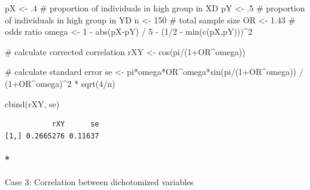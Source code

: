 \documentclass[
  letterpaper,
  DIV=11,
  numbers=noendperiod]{scrreprt}
\let\oldparagraph\paragraph
\renewcommand{\paragraph}[1]{\oldparagraph{#1}\mbox{}}
\newenvironment{Shaded}{}{}
\newcommand{\CommentTok}[1]{\textcolor[rgb]{0.54,0.53,0.53}{#1}}
\newcommand{\DecValTok}[1]{\textcolor[rgb]{0.69,0.50,0.00}{#1}}
\newcommand{\FloatTok}[1]{\textcolor[rgb]{0.69,0.50,0.00}{#1}}
\newcommand{\FunctionTok}[1]{\textcolor[rgb]{0.39,0.29,0.61}{#1}}
\newcommand{\NormalTok}[1]{\textcolor[rgb]{0.12,0.11,0.11}{#1}}
\newcommand{\OtherTok}[1]{\textcolor[rgb]{0.00,0.43,0.16}{#1}}
\newcommand{\SpecialCharTok}[1]{\textcolor[rgb]{0.24,0.68,0.91}{#1}}
\begin{document}
\begin{Shaded}
\begin{Highlighting}[]
\NormalTok{pX }\OtherTok{\textless{}{-}}\NormalTok{ .}\DecValTok{4} \CommentTok{\# proportion of individuals in high group in XD}
\NormalTok{pY }\OtherTok{\textless{}{-}}\NormalTok{ .}\DecValTok{5} \CommentTok{\# proportion of individuals in high group in YD}
\NormalTok{n }\OtherTok{\textless{}{-}} \DecValTok{150} \CommentTok{\# total sample size}
\NormalTok{OR }\OtherTok{\textless{}{-}} \FloatTok{1.43} \CommentTok{\# odds ratio}
\NormalTok{omega }\OtherTok{\textless{}{-}} \DecValTok{1} \SpecialCharTok{{-}} \FunctionTok{abs}\NormalTok{(pX}\SpecialCharTok{{-}}\NormalTok{pY) }\SpecialCharTok{/} \DecValTok{5} \SpecialCharTok{{-}}\NormalTok{ (}\DecValTok{1}\SpecialCharTok{/}\DecValTok{2} \SpecialCharTok{{-}} \FunctionTok{min}\NormalTok{(}\FunctionTok{c}\NormalTok{(pX,pY)))}\SpecialCharTok{\^{}}\DecValTok{2}

\CommentTok{\# calculate corrected correlation}
\NormalTok{rXY }\OtherTok{\textless{}{-}} \FunctionTok{cos}\NormalTok{(pi}\SpecialCharTok{/}\NormalTok{(}\DecValTok{1}\SpecialCharTok{+}\NormalTok{OR}\SpecialCharTok{\^{}}\NormalTok{omega))}

\CommentTok{\# calculate standard error}
\NormalTok{se }\OtherTok{\textless{}{-}}\NormalTok{ pi}\SpecialCharTok{*}\NormalTok{omega}\SpecialCharTok{*}\NormalTok{OR}\SpecialCharTok{\^{}}\NormalTok{omega}\SpecialCharTok{*}\FunctionTok{sin}\NormalTok{(pi}\SpecialCharTok{/}\NormalTok{(}\DecValTok{1}\SpecialCharTok{+}\NormalTok{OR}\SpecialCharTok{\^{}}\NormalTok{omega)) }\SpecialCharTok{/}\NormalTok{ (}\DecValTok{1}\SpecialCharTok{+}\NormalTok{OR}\SpecialCharTok{\^{}}\NormalTok{omega)}\SpecialCharTok{\^{}}\DecValTok{2} \SpecialCharTok{*} \FunctionTok{sqrt}\NormalTok{(}\DecValTok{4}\SpecialCharTok{/}\NormalTok{n)}

\FunctionTok{cbind}\NormalTok{(rXY, se)}
\end{Highlighting}
\end{Shaded}

\begin{verbatim}
           rXY      se
[1,] 0.2665276 0.11637
\end{verbatim}

\hypertarget{case-3-correlation-between-dichotomized-variables}{%
\paragraph*{Case 3: Correlation between dichotomized
variables}\label{case-3-correlation-between-dichotomized-variables}}
\end{document}
